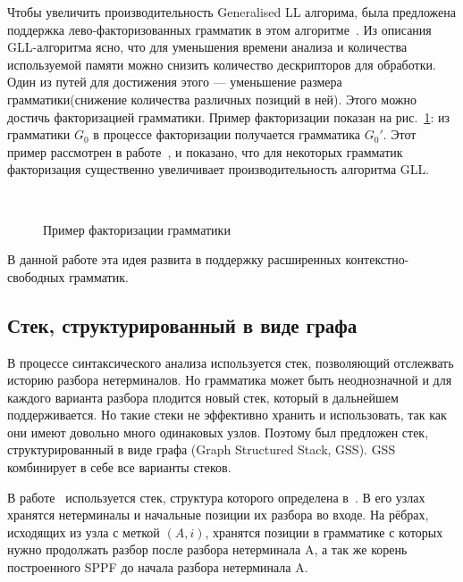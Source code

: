 \documentclass[14pt]{matmex-diploma-custom}
\begin{document}
    Чтобы увеличить производительность Generalised LL алгорима, была предложена поддержка 
    лево-факторизованных грамматик в этом алгоритме~\cite{scott2016structuring}.
    Из описания GLL-алгоритма ясно, что для уменьшения времени анализа и количества используемой памяти
    можно снизить количество дескрипторов для обработки. Один из путей для достижения этого --- 
    уменьшение размера грамматики(снижение количества различных позиций в ней).
    Этого можно достичь факторизацией грамматики. Пример факторизации показан на рис.~\ref{fig:ExampleOfFactorization}:
    из грамматики $G_0$ в процессе факторизации получается грамматика $G_0'$.
    Этот пример рассмотрен в работе~\cite{scott2016structuring}, и показано, что для некоторых грамматик факторизация 
    существенно увеличивает производительность алгоритма GLL.
    \begin{figure}
        \centering
        ~
        \caption{Пример факторизации грамматики}
        \label{fig:ExampleOfFactorization}
    \end{figure}
    В данной работе эта идея развита в поддержку расширенных контекстно-свободных грамматик.
	
	\subsection{Стек, структурированный в виде графа}
	В процессе синтаксического анализа используется стек, позволяющий отслежвать историю 
	разбора нетерминалов. Но грамматика может быть неоднозначной и для каждого варианта 
    разбора плодится новый стек, который в дальнейшем поддерживается.
    Но такие стеки не эффективно хранить и использовать, так как они имеют довольно много
    одинаковых узлов. Поэтому был предложен стек, структурированный в виде графа
    (Graph Structured Stack, GSS). GSS комбинирует в себе все варианты стеков.
    
    В работе~\cite{ragozina} используется стек, структура которого определена в~\cite{afroozeh2015faster}.
    В его узлах хранятся нетерминалы и начальные позиции их разбора во входе.
    На рёбрах, исходящих из узла с меткой $(A, i)$, хранятся позиции в грамматике с которых нужно
    продолжать разбор после разбора нетерминала A, а так же корень построенного SPPF до начала 
    разбора нетерминала A.
    
\end{document}
